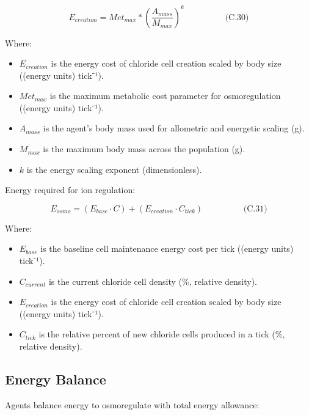 \documentclass[
]{book}
\begin{document}
\[
\begin{equation} E_{creation} = Met_{max} * (\frac{A_{mass}}{M_{max}})^k  \hspace{2cm} \text{(C.30)} \end{equation}
\]

Where:

\begin{itemize}
\item
  \(E_{creation}\) is the energy cost of chloride cell creation scaled
  by body size ((energy units) tick⁻¹).
\item
  \(Met_{max}\) is the maximum metabolic cost parameter for
  osmoregulation ((energy units) tick⁻¹).
\item
  \(A_{mass}\) is the agent's body mass used for allometric and
  energetic scaling (g).
\item
  \(M_{max}\) is the maximum body mass across the population (g).
\item
  \(k\) is the energy scaling exponent (dimensionless).
\end{itemize}

Energy required for ion regulation:

\[
\begin{equation} E_{osmo} = (E_{base} \cdot C) + (E_{creation} \cdot C_{tick})  \hspace{2cm} \text{(C.31)} \end{equation}
\]

Where:

\begin{itemize}
\item
  \(E_{base}\) is the baseline cell maintenance energy cost per tick
  ((energy units) tick⁻¹).
\item
  \(C_{current}\) is the current chloride cell density (\%, relative
  density).
\item
  \(E_{creation}\) is the energy cost of chloride cell creation scaled
  by body size ((energy units) tick⁻¹).
\item
  \(C_{tick}\) is the relative percent of new chloride cells produced in
  a tick (\%, relative density).
\end{itemize}

\subsection{Energy Balance}\label{energy-balance}

Agents balance energy to osmoregulate with total energy allowance:
\end{document}
